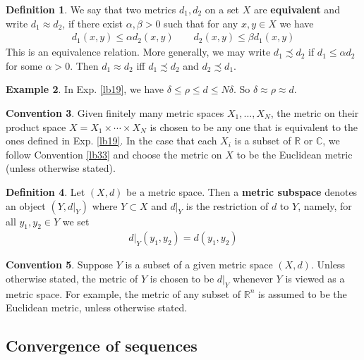 \documentclass[12pt,b5paper,notitlepage]{article}
\theoremstyle{definition}
\newtheorem{df}{Definition}[section]
\newtheorem{eg}[df]{Example}
\newtheorem{cv}[df]{Convention}
\theoremstyle{plain}
\newcommand{\Cbb}{\mathbb C}
\newcommand{\Rbb}{\mathbb R}
\numberwithin{equation}{section}
\begin{document}
\begin{df}
We say that two metrics $d_1,d_2$ on a set $X$ are  \textbf{equivalent} and write $d_1\approx d_2$, if there exist $\alpha,\beta>0$ such that  for any $x,y\in X$ we have
\begin{gather*}
d_1(x,y)\leq\alpha d_2(x,y)\qquad d_2(x,y)\leq\beta d_1(x,y)
\end{gather*}  
This is an equivalence relation. More generally, we may write $d_1\precsim d_2$ if $d_1\leq \alpha d_2$ for some $\alpha>0$. Then $d_1\approx d_2$ iff $d_1\precsim d_2$ and $d_2\precsim d_1$.
\end{df}



\begin{eg}
In Exp. \ref{lb19}, we have $\delta\leq \rho\leq d\leq N\delta$. So $\delta\approx\rho\approx d$.
\end{eg}

\begin{cv}\label{lb32}
Given finitely many metric spaces $X_1,\dots,X_N$, the metric on their product space $X=X_1\times\cdots\times X_N$ is chosen to be any one that is equivalent to the ones defined in Exp. \ref{lb19}. In the case that each $X_i$ is a subset of $\Rbb$ or $\Cbb$, we follow Convention \ref{lb33} and choose the metric on $X$ to be the Euclidean metric (unless otherwise stated).
\end{cv}


\begin{df}\label{lb43}
Let $(X,d)$ be a metric space. Then a \textbf{metric subspace}  denotes an object $(Y,d|_Y)$ where $Y\subset X$ and $d|_Y$ is the restriction of $d$ to $Y$, namely, for all $y_1,y_2\in Y$ we set
\begin{align*}
d|_Y(y_1,y_2)=d(y_1,y_2)
\end{align*}
\end{df}

\begin{cv}\label{lb76}
Suppose $Y$ is a subset of a given metric space $(X,d)$. Unless otherwise stated, the metric of $Y$ is chosen to be $d|_Y$ whenever $Y$ is viewed as a metric space. For example, the metric of any subset of $\Rbb^n$ is assumed to be the Euclidean metric, unless otherwise stated.
\end{cv}



\subsection{Convergence of sequences} \label{lb73}
\end{document}
